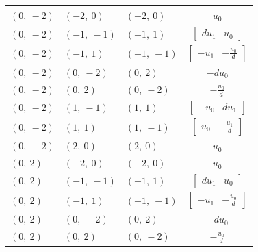 \documentclass[11pt]{article}
\theoremstyle{definition}
\begin{document}
\begin{longtable}{|l|l|l|c|}
    \hline
    $\left( 0, \  -2\right)$ & $\left( -2, \  0\right)$ & $\left( -2, \  0\right)$ & $u_{0}$ \\
    \hline
    $\left( 0, \  -2\right)$ & $\left( -1, \  -1\right)$ & $\left( -1, \  1\right)$ & $\left[\begin{matrix}d u_{1} & u_{0}\end{matrix}\right]$ \\
    \hline
    $\left( 0, \  -2\right)$ & $\left( -1, \  1\right)$ & $\left( -1, \  -1\right)$ & $\left[\begin{matrix}- u_{1} & - \frac{u_{0}}{d}\end{matrix}\right]$ \\
    \hline
    $\left( 0, \  -2\right)$ & $\left( 0, \  -2\right)$ & $\left( 0, \  2\right)$ & $- d u_{0}$ \\
    \hline
    $\left( 0, \  -2\right)$ & $\left( 0, \  2\right)$ & $\left( 0, \  -2\right)$ & $- \frac{u_{0}}{d}$ \\
    \hline
    $\left( 0, \  -2\right)$ & $\left( 1, \  -1\right)$ & $\left( 1, \  1\right)$ & $\left[\begin{matrix}- u_{0} & d u_{1}\end{matrix}\right]$ \\
    \hline
    $\left( 0, \  -2\right)$ & $\left( 1, \  1\right)$ & $\left( 1, \  -1\right)$ & $\left[\begin{matrix}u_{0} & - \frac{u_{1}}{d}\end{matrix}\right]$ \\
    \hline
    $\left( 0, \  -2\right)$ & $\left( 2, \  0\right)$ & $\left( 2, \  0\right)$ & $u_{0}$ \\
    \hline
    $\left( 0, \  2\right)$ & $\left( -2, \  0\right)$ & $\left( -2, \  0\right)$ & $u_{0}$ \\
    \hline
    $\left( 0, \  2\right)$ & $\left( -1, \  -1\right)$ & $\left( -1, \  1\right)$ & $\left[\begin{matrix}d u_{1} & u_{0}\end{matrix}\right]$ \\
    \hline
    $\left( 0, \  2\right)$ & $\left( -1, \  1\right)$ & $\left( -1, \  -1\right)$ & $\left[\begin{matrix}- u_{1} & - \frac{u_{0}}{d}\end{matrix}\right]$ \\
    \hline
    $\left( 0, \  2\right)$ & $\left( 0, \  -2\right)$ & $\left( 0, \  2\right)$ & $- d u_{0}$ \\
    \hline
    $\left( 0, \  2\right)$ & $\left( 0, \  2\right)$ & $\left( 0, \  -2\right)$ & $- \frac{u_{0}}{d}$ \\

\end{longtable}
\end{document}
